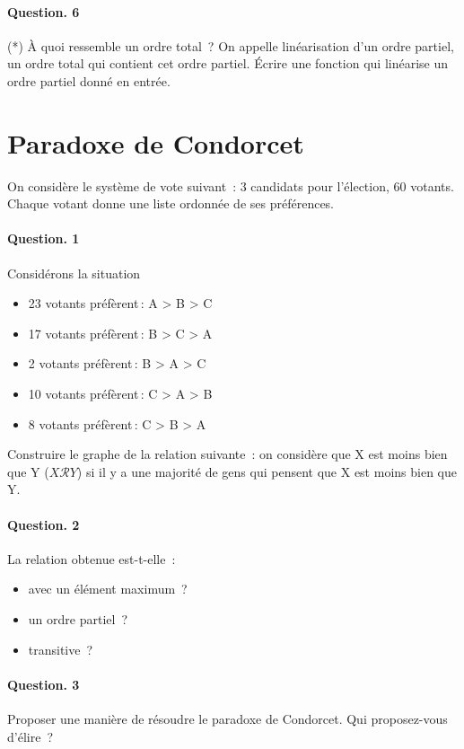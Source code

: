 \documentclass[10pt,a4paper]{article}
\begin{document}
\paragraph{Question. 6\\}
(*) À quoi ressemble un ordre total~? On appelle linéarisation d'un ordre
partiel, un ordre total qui contient cet ordre partiel. Écrire une
fonction qui linéarise un ordre partiel donné en entrée.
 
\section{Paradoxe de Condorcet}
On considère le système de vote suivant~: 3 candidats pour l'élection,
60 votants. Chaque votant donne une liste ordonnée de ses préférences.
\paragraph{Question. 1\\}
Considérons la situation         
\begin{itemize}
\item 23 votants préfèrent\,: A > B > C
\item 17 votants préfèrent\,: B > C > A
\item 2 votants préfèrent\,: B > A > C
\item 10 votants préfèrent\,: C > A > B
\item 8 votants préfèrent\,: C > B > A
\end{itemize}
Construire le graphe de la relation suivante~: on considère que X est moins 
bien que Y ($X\mathcal{R}Y$) si il y a une majorité de gens qui pensent que X 
est moins bien que Y.
\paragraph{Question. 2\\}
La relation obtenue est-t-elle~:
\begin{itemize}
\item avec un élément maximum~?
\item un ordre partiel~?
\item transitive~?
\end{itemize}
\paragraph{Question. 3\\}
Proposer une manière de résoudre le paradoxe de Condorcet. Qui proposez-vous 
d'élire~?
\end{document}
